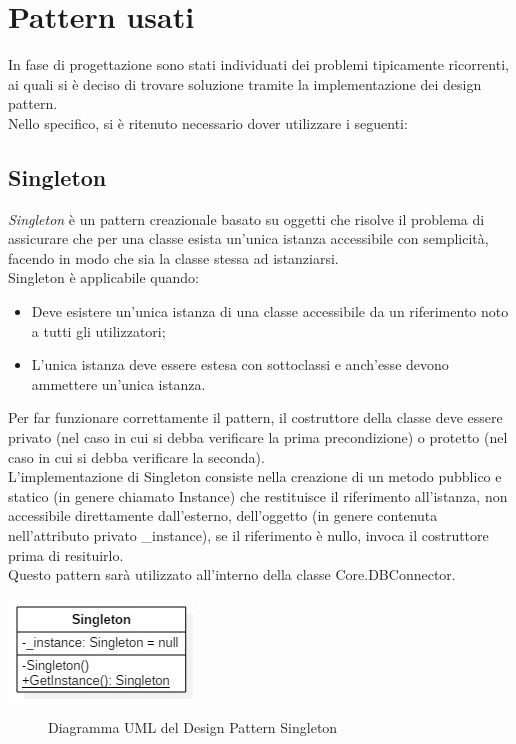 \documentclass[a4paper,10pt]{report}
\begin{document}
	\section{Pattern usati}
		In fase di progettazione sono stati individuati dei problemi tipicamente
			ricorrenti, ai quali si è deciso di trovare soluzione tramite la
			implementazione dei design pattern.\\
			Nello specifico, si è ritenuto necessario dover utilizzare i seguenti:
		\subsection{Singleton}
			{\itshape Singleton} è un pattern creazionale basato su oggetti che
			risolve il problema di assicurare che per una classe esista un’unica
			istanza accessibile con semplicità, facendo in modo che sia la classe
			stessa ad istanziarsi.\\
			Singleton è applicabile quando:
			\begin{itemize}
				\item Deve esistere un’unica istanza di una classe accessibile
					da un riferimento noto a tutti gli utilizzatori;
				\item L’unica istanza deve essere estesa con sottoclassi e
					anch’esse devono ammettere un’unica istanza.
				\end{itemize}
			Per far funzionare correttamente il pattern, il costruttore della classe
			deve essere privato (nel caso in cui si debba verificare la prima
			precondizione) o protetto (nel caso in cui si debba verificare la seconda).\\
			L’implementazione di Singleton consiste nella creazione di un metodo pubblico
			e statico (in genere chiamato Instance) che restituisce il riferimento
			all’istanza, non accessibile direttamente dall’esterno, dell’oggetto
			(in genere contenuta nell’attributo privato \_instance), se il riferimento è
			nullo, invoca il costruttore prima di resituirlo.\\
			Questo pattern sarà utilizzato all'interno della classe Core.DBConnector.
			\begin{center}
				\includegraphics[scale=1]{immagini/Singleton.jpg}
				\end{center}
			\begin{figure}[!h]
					\caption{Diagramma UML del Design Pattern Singleton}
				\end{figure}
		\newpage
\end{document}
